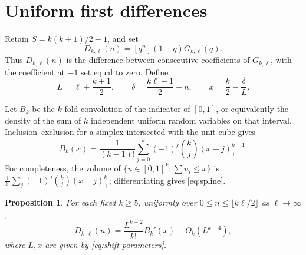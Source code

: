 \documentclass[3p,11pt,number]{elsarticle}
\newtheorem{proposition}[theorem]{Proposition}
\theoremstyle{remark}
\numberwithin{equation}{section}
\newcommand{\coeff}[1]{[q^{#1}]}
\begin{document}
\section{Uniform first differences}

Retain \(S=k(k+1)/2-1\), and set
\begin{equation}\label{eq:D}
D_{k,\ell}(n)=\coeff{n}(1-q)G_{k,\ell}(q).
\end{equation}
Thus \(D_{k,\ell}(n)\) is the difference between consecutive
coefficients of \(G_{k,\ell}\), with the coefficient at \(-1\) set
equal to zero.
Define
\begin{equation}\label{eq:shift-parameters}
L=\ell+\frac{k+1}{2},\qquad
\delta=\frac{k\ell+1}{2}-n,\qquad
x=\frac k2-\frac{\delta}{L}.
\end{equation}

Let \(B_k\) be the \(k\)-fold convolution of the indicator of
\([0,1]\), or equivalently the density of the sum of \(k\) independent
uniform random variables on that interval.
Inclusion--exclusion for a simplex intersected with the unit cube
gives
\begin{equation}\label{eq:spline}
B_k(x)=\frac1{(k-1)!}
\sum_{j=0}^{k}(-1)^j\binom{k}{j}(x-j)_+^{k-1}.
\end{equation}
For completeness, the volume of
\(\{u\in[0,1]^k:\sum u_i\le x\}\) is
\(\frac1{k!}\sum_j(-1)^j\binom{k}{j}(x-j)_+^k\);
differentiating gives \eqref{eq:spline}.

\begin{proposition}\label{prop:uniform}
For each fixed \(k\ge5\), uniformly over
\(0\le n\le\lfloor k\ell/2\rfloor\) as \(\ell\to\infty\),
\begin{equation}\label{eq:uniform}
D_{k,\ell}(n)=\frac{L^{k-2}}{k!}B_k'(x)
+O_k(L^{k-4}),
\end{equation}
where \(L,x\) are given by \eqref{eq:shift-parameters}.
\end{proposition}
\end{document}
